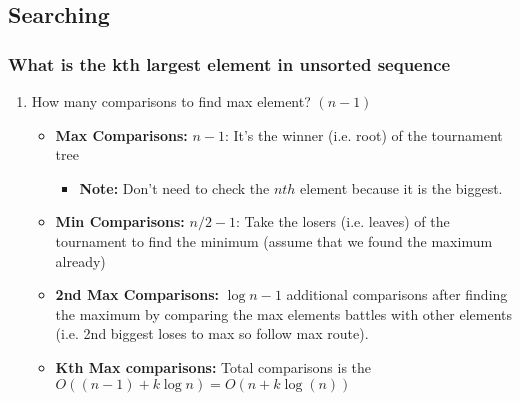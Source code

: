 \subsection{Searching}
    \subsubsection{What is the kth largest element in unsorted sequence}
    \begin{definition}
        \begin{enumerate}
            \item How many comparisons to find max element? $(n-1)$ 
            \begin{itemize}
                \item \textbf{Max Comparisons:} $n-1$: It's the winner (i.e. root) of the tournament tree
                \begin{itemize}
                    \item \textbf{Note:} Don't need to check the $nth$ element because it is the biggest.
                \end{itemize}
                \item \textbf{Min Comparisons:} $n/2 - 1$: Take the losers (i.e. leaves) of the tournament to find the minimum (assume that we found the maximum already)
                \item \textbf{2nd Max Comparisons:} $\log n - 1$ additional comparisons after finding the maximum by comparing the max elements battles with other elements (i.e. 2nd biggest loses to max so follow max route).
                \item \textbf{Kth Max comparisons:} Total comparisons is the $O((n-1) + k\log n)=O(n+k\log(n))$
            \end{itemize}

        \end{enumerate}
    \end{definition}

